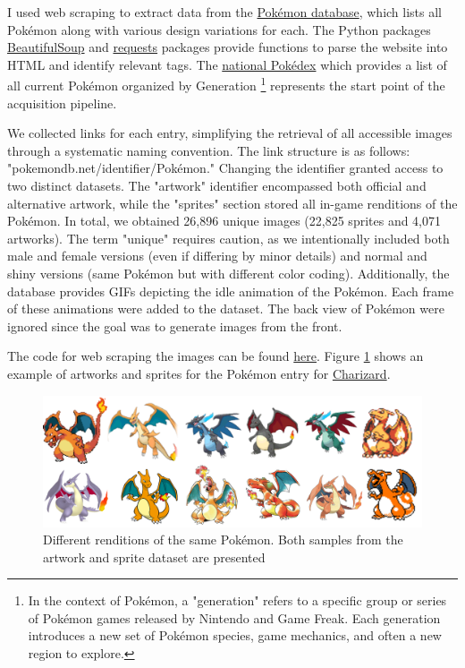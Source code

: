 \documentclass[12pt]{article}
\theoremstyle{plain}
\theoremstyle{definition}
\theoremstyle{remark}
\begin{document}
I used web scraping to extract data from the \href{https://pokemondb.net/}{Pokémon database}, which lists all Pokémon along with various design variations for each. The Python packages \href{https://www.crummy.com/software/BeautifulSoup/bs4/doc/}{BeautifulSoup} and \href{https://requests.readthedocs.io/en/latest/}{requests} packages provide functions to parse the website into \ac{HTML} and identify relevant tags. The \href{https://pokemondb.net/pokedex/national}{national Pokédex} which provides a list of all current Pokémon organized by Generation \footnote{In the context of Pokémon, a "generation" refers to a specific group or series of Pokémon games released by Nintendo and Game Freak. Each generation introduces a new set of Pokémon species, game mechanics, and often a new region to explore.} represents the start point of the acquisition pipeline.

We collected links for each entry, simplifying the retrieval of all accessible images through a systematic naming convention. The link structure is as follows: "pokemondb.net/identifier/Pokémon." Changing the identifier granted access to two distinct datasets. The "artwork" identifier encompassed both official and alternative artwork, while the "sprites" section stored all in-game renditions of the Pokémon. In total, we obtained 26,896 unique images (22,825 sprites and 4,071 artworks). The term "unique" requires caution, as we intentionally included both male and female versions (even if differing by minor details) and normal and shiny versions (same Pokémon but with different color coding). Additionally, the database provides GIFs depicting the idle animation of the Pokémon. Each frame of these animations were added to the dataset. The back view of Pokémon were ignored since the goal was to generate images from the front. 

The code for web scraping the images can be found \href{https://github.com/mhueppe/Diffusion_Models/tree/master/preprocessing}{here}. Figure \ref{fig:variouscharizard} shows an example of artworks and sprites for the Pokémon entry for \href{https://pokemondb.net/pokedex/charizard}{Charizard}.

\begin{figure}[h]
	\centering
	\includegraphics[width=\linewidth]{src/Images/various_charizard}
	\caption[Different Pokémon renditions]{Different renditions of the same Pokémon. Both samples from the artwork and sprite dataset are presented}
	\label{fig:variouscharizard}
\end{figure}
\end{document}
